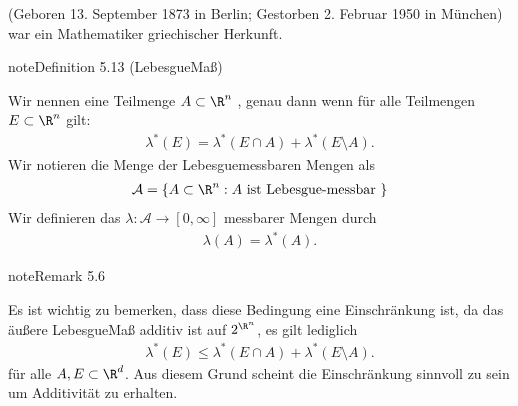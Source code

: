 \documentclass[letterpaper,10pt,english]{jupyterBook}
\begin{document}
\begin{sphinxShadowBox}

\sphinxAtStartPar
{} (Geboren 13. September 1873 in Berlin; Gestorben 2. Februar 1950 in München) war ein Mathematiker griechischer Herkunft.
\end{sphinxShadowBox}
\label{masstheorie/masstheorie:definition-32}
\begin{sphinxadmonition}{note}{Definition 5.13 (Lebesgue\sphinxhyphen{}Maß)}



\sphinxAtStartPar
Wir nennen eine Teilmenge \(A \subset \R^n\) , genau dann wenn für alle Teilmengen \(E \subset \R^n\) gilt:
\begin{equation*}
\begin{split}\lambda^*(E) = \lambda^*(E \cap A) + \lambda^*(E \setminus A).\end{split}
\end{equation*}
\sphinxAtStartPar
Wir notieren die Menge der Lebesgue\sphinxhyphen{}messbaren Mengen als
\begin{equation*}
\begin{split}\mathcal{A} = \lbrace A \subset \R^n : A \text{ ist Lebesgue-messbar } \rbrace\end{split}
\end{equation*}
\sphinxAtStartPar
Wir definieren das  \(\lambda \colon \mathcal{A} \rightarrow [0,\infty]\) messbarer Mengen durch
\begin{equation*}
\begin{split}\lambda(A) = \lambda^*(A).\end{split}
\end{equation*}\end{sphinxadmonition}
\label{masstheorie/masstheorie:remark-33}
\begin{sphinxadmonition}{note}{Remark 5.6}



\sphinxAtStartPar
Es ist wichtig zu bemerken, dass diese Bedingung eine Einschränkung ist, da das äußere Lebesgue\sphinxhyphen{}Maß  additiv ist auf \(2^{\R^n}\), es gilt lediglich
\begin{equation*}
\begin{split}\lambda^*(E) \leq \lambda^*(E \cap A) + \lambda^*(E \setminus A).\end{split}
\end{equation*}
\sphinxAtStartPar
für alle \(A,E\subset\R^d\). Aus diesem Grund scheint die Einschränkung sinnvoll zu sein um Additivität zu erhalten.
\end{sphinxadmonition}
\end{document}
